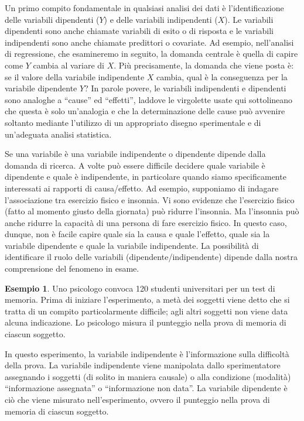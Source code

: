 \documentclass[
  11pt,
]{krantz}
\theoremstyle{definition}
\theoremstyle{definition}
\newtheorem{example}{Esempio}[chapter]
\theoremstyle{definition}
\theoremstyle{definition}
\theoremstyle{remark}
\begin{document}
Un primo compito fondamentale in qualsiasi analisi dei dati è l'identificazione delle variabili dipendenti (\(Y\)) e delle variabili indipendenti (\(X\)). Le variabili dipendenti sono anche chiamate variabili di esito o di risposta e le variabili indipendenti sono anche chiamate predittori o covariate. Ad esempio, nell'analisi di regressione, che esamineremo in seguito, la domanda centrale è quella di capire come \(Y\) cambia al variare di \(X\). Più precisamente, la domanda che viene posta è: se il valore della variabile indipendente \(X\) cambia, qual è la conseguenza per la variabile dipendente \(Y\)? In parole povere, le variabili indipendenti e dipendenti sono analoghe a ``cause'' ed ``effetti'', laddove le virgolette usate qui sottolineano che questa è solo un'analogia e che la determinazione delle cause può avvenire soltanto mediante l'utilizzo di un appropriato disegno sperimentale e di un'adeguata analisi statistica.

Se una variabile è una variabile indipendente o dipendente dipende dalla domanda di ricerca. A volte può essere difficile decidere quale variabile è dipendente e quale è indipendente, in particolare quando siamo specificamente interessati ai rapporti di causa/effetto. Ad esempio, supponiamo di indagare l'associazione tra esercizio fisico e insonnia. Vi sono evidenze che l'esercizio fisico (fatto al momento giusto della giornata) può ridurre l'insonnia. Ma l'insonnia può anche ridurre la capacità di una persona di fare esercizio fisico. In questo caso, dunque, non è facile capire quale sia la causa e quale l'effetto, quale sia la variabile dipendente e quale la variabile indipendente. La possibilità di identificare il ruolo delle variabili (dipendente/indipendente) dipende dalla nostra comprensione del fenomeno in esame.

\begin{example}
Uno psicologo convoca 120 studenti universitari per un test di memoria. Prima di iniziare l'esperimento, a metà dei soggetti viene detto che si tratta di un compito particolarmente difficile; agli altri soggetti non viene data alcuna indicazione. Lo psicologo misura il punteggio nella prova di memoria di ciascun soggetto.

In questo esperimento, la variabile indipendente è l'informazione sulla difficoltà della prova. La variabile indipendente viene manipolata dallo sperimentatore assegnando i soggetti (di solito in maniera causale) o alla condizione (modalità) ``informazione assegnata'' o ``informazione non data''. La variabile dipendente è ciò che viene misurato nell'esperimento, ovvero il punteggio nella prova di memoria di ciascun soggetto.
\end{example}
\end{document}
